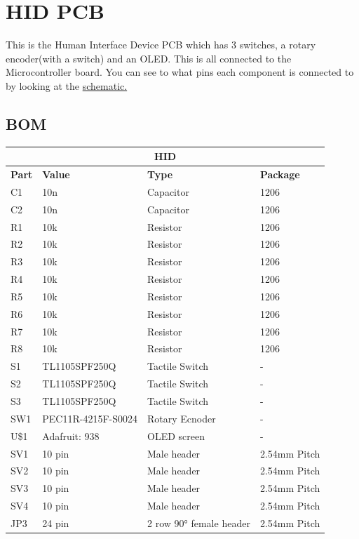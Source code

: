 \documentclass{article}
\begin{document}
\section{HID PCB}
This is the Human Interface Device PCB which has 3 switches, a rotary encoder(with a switch) and an OLED. 
This is all connected to the Microcontroller board. You can see to what pins each component is connected to by looking at the  \hyperref[fig:schematic4]{schematic.}

 \subsection{BOM}
  \begin{center}
    \begin{tabular}{ |m{2em}|m{7em}|m{7em}|m{7em}|}
    \hline
	 \multicolumn{4}{|c|}{\textbf{HID}} \\
	 \hline
       \textbf{Part} & \textbf{Value} & \textbf{Type} & \textbf{Package} \\ \hline
      C1 & 10n & Capacitor & 1206 \\ \hline
      C2 & 10n & Capacitor & 1206 \\ \hline
	R1 & 10k & Resistor & 1206 \\ \hline
	R2 & 10k & Resistor & 1206 \\ \hline
	R3 & 10k & Resistor & 1206 \\ \hline
	R4 & 10k & Resistor & 1206 \\ \hline
	R5 & 10k & Resistor & 1206 \\ \hline
	R6 & 10k & Resistor & 1206 \\ \hline
	R7 & 10k & Resistor & 1206 \\ \hline
	R8 & 10k & Resistor & 1206 \\ \hline
	S1 & TL1105SPF250Q & Tactile Switch & - \\ \hline
	S2 & TL1105SPF250Q & Tactile Switch & -\\ \hline
	S3 & TL1105SPF250Q & Tactile Switch & -\\ \hline
	SW1 & PEC11R-4215F-S0024 & Rotary Ecnoder & - \\ \hline
	U\$1 & Adafruit: 938  & OLED screen & -  \\ \hline
	SV1 & 10 pin & Male header & 2.54mm Pitch \\ \hline
	SV2 & 10 pin & Male header & 2.54mm Pitch \\ \hline
	SV3 & 10 pin & Male header & 2.54mm Pitch \\ \hline
	SV4 & 10 pin & Male header & 2.54mm Pitch \\ \hline
	JP3  & 24 pin & 2 row 90° female header & 2.54mm Pitch \\ \hline

    \end{tabular}
     \end{center}
     
\end{document}
